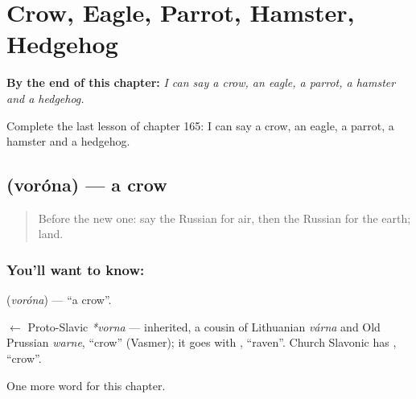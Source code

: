 
\chapter{Crow, Eagle, Parrot, Hamster, Hedgehog}
\label{ch:ru-crow-eagle-parrot-hamster-hedgehog}

\begin{chapteropening}
\textbf{By the end of this chapter:} \emph{I can say a crow, an eagle, a parrot, a hamster and a hedgehog.}

Complete the last lesson of chapter 165: I can say a crow, an eagle, a parrot, a hamster and a hedgehog.
\end{chapteropening}

\section[\texorpdfstring{\ru{ворона} (voróna)}{ворона (voróna)}]{ (voróna) — a crow}

\label{lesson:RU-C165-vorona}



\begin{quote}
Before the new one: say the Russian for air, then the Russian for the earth; land.
\end{quote}

\subsection*{You'll want to know: }
\textbf{} (\emph{voróna}) — \textquotedblleft{}a crow\textquotedblright{}.

\begin{cousinweb}
\textbf{} $\leftarrow$ Proto-Slavic \emph{*vorna} — inherited, a cousin of Lithuanian \emph{várna} and Old Prussian \emph{warne}, \textquotedblleft{}crow\textquotedblright{} (Vasmer); it goes with \emph{}, \textquotedblleft{}raven\textquotedblright{}. Church Slavonic has \emph{}, \textquotedblleft{}crow\textquotedblright{}.
\end{cousinweb}

\begin{grammarlens}[title={What you've built}]
One more word for this chapter.
\end{grammarlens}

